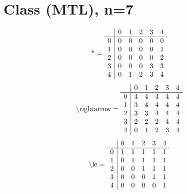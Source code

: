 \documentclass[11pt]{article}
\begin{document}
\section{Class (MTL), n=7}
\[\text{*} = 
\begin{array}{r | r r r r r}
 & 0 & 1 & 2 & 3 & 4 \\ \hline
0 & 0 & 0 & 0 & 0 & 0 \\
1 & 0 & 0 & 0 & 0 & 1 \\
2 & 0 & 0 & 0 & 0 & 2 \\
3 & 0 & 0 & 0 & 3 & 3 \\
4 & 0 & 1 & 2 & 3 & 4 \\
\end{array}
\]
\[\text{\textbackslash rightarrow} = 
\begin{array}{r | r r r r r}
 & 0 & 1 & 2 & 3 & 4 \\ \hline
0 & 4 & 4 & 4 & 4 & 4 \\
1 & 3 & 4 & 4 & 4 & 4 \\
2 & 3 & 3 & 4 & 4 & 4 \\
3 & 2 & 2 & 2 & 4 & 4 \\
4 & 0 & 1 & 2 & 3 & 4 \\
\end{array}
\]
\[\text{\textbackslash le} = 
\begin{array}{r | r r r r r}
 & 0 & 1 & 2 & 3 & 4 \\ \hline
0 & 1 & 1 & 1 & 1 & 1 \\
1 & 0 & 1 & 1 & 1 & 1 \\
2 & 0 & 0 & 1 & 1 & 1 \\
3 & 0 & 0 & 0 & 1 & 1 \\
4 & 0 & 0 & 0 & 0 & 1 \\
\end{array}
\]
\end{document}
